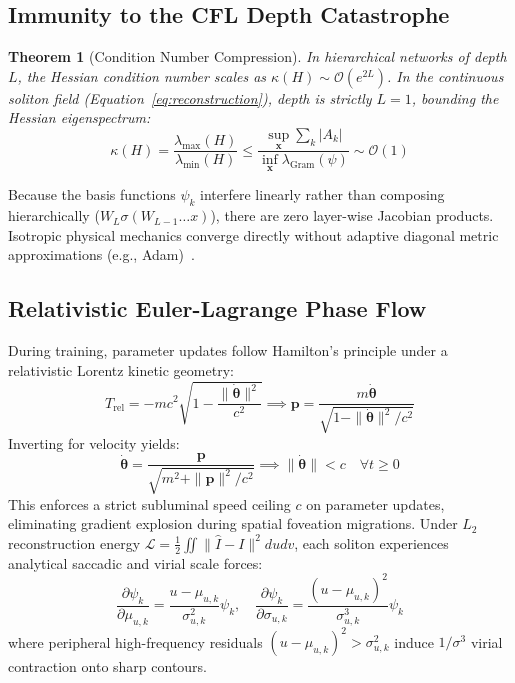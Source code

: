 \documentclass[10pt,twocolumn]{article}
\newtheorem{theorem}{Theorem}
\begin{document}
\subsection{Immunity to the CFL Depth Catastrophe}
\begin{theorem}[Condition Number Compression]
In hierarchical networks of depth $L$, the Hessian condition number scales as $\kappa(H) \sim \mathcal{O}(e^{2L})$. In the continuous soliton field (Equation~\ref{eq:reconstruction}), depth is strictly $L = 1$, bounding the Hessian eigenspectrum:
\begin{equation}
    \kappa(H) = \frac{\lambda_{\max}(H)}{\lambda_{\min}(H)} \le \frac{\sup_{\mathbf{x}} \sum_{k} |A_k|}{\inf_{\mathbf{x}} \lambda_{\text{Gram}}(\psi)} \sim \mathcal{O}(1)
\end{equation}
\end{theorem}
Because the basis functions $\psi_k$ interfere linearly rather than composing hierarchically ($W_L \sigma(W_{L-1} \dots x)$), there are zero layer-wise Jacobian products. Isotropic physical mechanics converge directly without adaptive diagonal metric approximations (e.g., Adam)~\cite{barmase2026variational}.

\subsection{Relativistic Euler-Lagrange Phase Flow}
During training, parameter updates follow Hamilton's principle under a relativistic Lorentz kinetic geometry:
\begin{equation}
    T_{\text{rel}} = -m c^2 \sqrt{1 - \frac{\|\dot{\mathbf{\theta}}\|^2}{c^2}} \implies \mathbf{p} = \frac{m \dot{\mathbf{\theta}}}{\sqrt{1 - \|\dot{\mathbf{\theta}}\|^2 / c^2}}
\end{equation}
Inverting for velocity yields:
\begin{equation}
    \dot{\mathbf{\theta}} = \frac{\mathbf{p}}{\sqrt{m^2 + \|\mathbf{p}\|^2 / c^2}} \implies \|\dot{\mathbf{\theta}}\| < c \quad \forall t \ge 0
\end{equation}
This enforces a strict subluminal speed ceiling $c$ on parameter updates, eliminating gradient explosion during spatial foveation migrations. Under $L_2$ reconstruction energy $\mathcal{L} = \frac{1}{2}\iint \|\hat{I} - I\|^2 du dv$, each soliton experiences analytical saccadic and virial scale forces:
\begin{equation}
    \frac{\partial \psi_k}{\partial \mu_{u,k}} = \frac{u - \mu_{u,k}}{\sigma_{u,k}^2}\psi_k, \quad \frac{\partial \psi_k}{\partial \sigma_{u,k}} = \frac{(u - \mu_{u,k})^2}{\sigma_{u,k}^3}\psi_k
    \label{eq:foveation_forces}
\end{equation}
where peripheral high-frequency residuals $(u - \mu_{u,k})^2 > \sigma_{u,k}^2$ induce $1/\sigma^3$ virial contraction onto sharp contours.
\end{document}
